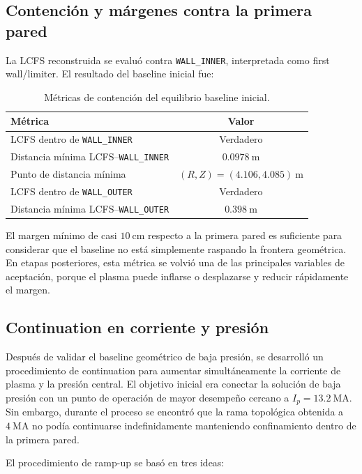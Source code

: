 \documentclass[11pt,a4paper]{article}
\begin{document}
\subsection{Contención y márgenes contra la primera pared}
La LCFS reconstruida se evaluó contra \texttt{WALL\_INNER}, interpretada como first wall/limiter.
El resultado del baseline inicial fue:

\begin{table}[htbp]
\centering
\caption{Métricas de contención del equilibrio baseline inicial.}
\label{tab:containment_metrics}
\begin{tabular}{lc}
\toprule
\textbf{Métrica} & \textbf{Valor} \\
\midrule
LCFS dentro de \texttt{WALL\_INNER} & Verdadero \\
Distancia mínima LCFS--\texttt{WALL\_INNER} & $0.0978~\mathrm{m}$ \\
Punto de distancia mínima & $(R,Z)=(4.106,4.085)~\mathrm{m}$ \\
LCFS dentro de \texttt{WALL\_OUTER} & Verdadero \\
Distancia mínima LCFS--\texttt{WALL\_OUTER} & $0.398~\mathrm{m}$ \\
\bottomrule
\end{tabular}
\end{table}

El margen mínimo de casi $10~\mathrm{cm}$ respecto a la primera pared es suficiente para
considerar que el baseline no está simplemente raspando la frontera geométrica. En etapas
posteriores, esta métrica se volvió una de las principales variables de aceptación, porque el
plasma puede inflarse o desplazarse y reducir rápidamente el margen.

\subsection{Continuation en corriente y presión}
Después de validar el baseline geométrico de baja presión, se desarrolló un procedimiento de
continuation para aumentar simultáneamente la corriente de plasma y la presión central. El
objetivo inicial era conectar la solución de baja presión con un punto de operación de mayor
desempeño cercano a $I_p=13.2~\mathrm{MA}$. Sin embargo, durante el proceso se encontró que la
rama topológica obtenida a $4~\mathrm{MA}$ no podía continuarse indefinidamente manteniendo
confinamiento dentro de la primera pared.

El procedimiento de ramp-up se basó en tres ideas:
\end{document}
